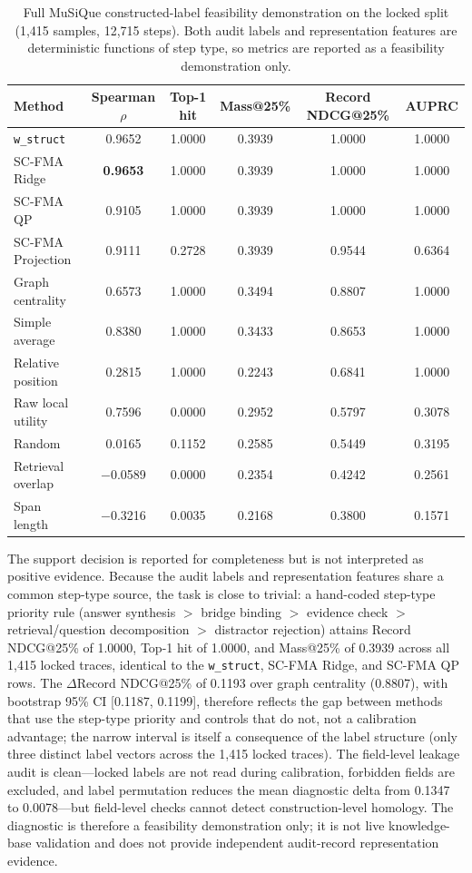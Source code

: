 \documentclass[pdflatex,sn-mathphys-num]{sn-jnl}
\begin{document}
\begin{table}[ht]
\caption{Full MuSiQue constructed-label feasibility demonstration on the locked split (1,415 samples, 12,715 steps). Both audit labels and representation features are deterministic functions of step type, so metrics are reported as a feasibility demonstration only.}
\label{tab:supp-musique-knowledge-audit}
\centering
\small
\begin{tabular}{lccccc}
\toprule
\textbf{Method} & \textbf{Spearman $\rho$} & \textbf{Top-1 hit} & \textbf{Mass@25\%} & \textbf{Record NDCG@25\%} & \textbf{AUPRC} \\
\midrule
\texttt{w\_struct} & 0.9652 & 1.0000 & 0.3939 & 1.0000 & 1.0000 \\
SC-FMA Ridge & \textbf{0.9653} & 1.0000 & 0.3939 & 1.0000 & 1.0000 \\
SC-FMA QP & 0.9105 & 1.0000 & 0.3939 & 1.0000 & 1.0000 \\
SC-FMA Projection & 0.9111 & 0.2728 & 0.3939 & 0.9544 & 0.6364 \\
Graph centrality & 0.6573 & 1.0000 & 0.3494 & 0.8807 & 1.0000 \\
Simple average & 0.8380 & 1.0000 & 0.3433 & 0.8653 & 1.0000 \\
Relative position & 0.2815 & 1.0000 & 0.2243 & 0.6841 & 1.0000 \\
Raw local utility & 0.7596 & 0.0000 & 0.2952 & 0.5797 & 0.3078 \\
Random & 0.0165 & 0.1152 & 0.2585 & 0.5449 & 0.3195 \\
Retrieval overlap & $-$0.0589 & 0.0000 & 0.2354 & 0.4242 & 0.2561 \\
Span length & $-$0.3216 & 0.0035 & 0.2168 & 0.3800 & 0.1571 \\
\bottomrule
\end{tabular}
\end{table}

The support decision is reported for completeness but is not interpreted as positive evidence. Because the audit labels and representation features share a common step-type source, the task is close to trivial: a hand-coded step-type priority rule (answer synthesis $>$ bridge binding $>$ evidence check $>$ retrieval/question decomposition $>$ distractor rejection) attains Record NDCG@25\% of 1.0000, Top-1 hit of 1.0000, and Mass@25\% of 0.3939 across all 1,415 locked traces, identical to the \texttt{w\_struct}, SC-FMA Ridge, and SC-FMA QP rows. The $\Delta$Record NDCG@25\% of 0.1193 over graph centrality (0.8807), with bootstrap 95\% CI [0.1187, 0.1199], therefore reflects the gap between methods that use the step-type priority and controls that do not, not a calibration advantage; the narrow interval is itself a consequence of the label structure (only three distinct label vectors across the 1,415 locked traces). The field-level leakage audit is clean---locked labels are not read during calibration, forbidden fields are excluded, and label permutation reduces the mean diagnostic delta from 0.1347 to 0.0078---but field-level checks cannot detect construction-level homology. The diagnostic is therefore a feasibility demonstration only; it is not live knowledge-base validation and does not provide independent audit-record representation evidence.
\end{document}
